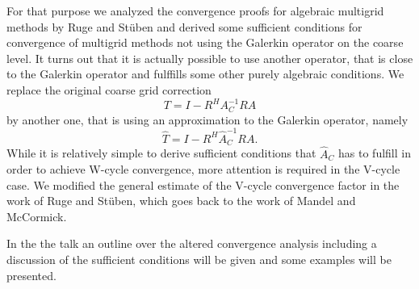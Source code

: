 \documentclass{report}
\begin{document}
For that purpose we analyzed the convergence proofs for algebraic
multigrid methods by Ruge and St\"uben and derived some sufficient
conditions for convergence of multigrid methods not using the Galerkin
operator on the coarse level. It turns out that it is actually possible
to use another operator, that is close to the Galerkin operator and
fulffills some other purely algebraic conditions. We replace the original
coarse grid correction
\begin{equation*}
T = I - R^{H} A_{C}^{-1} R A
\end{equation*}
by another one, that is using an approximation to the Galerkin operator, namely
\begin{equation*}
\hat{T} = I - R^{H} \hat{A}_{C}^{-1} R A.
\end{equation*}
While it is relatively simple to derive sufficient conditions that
$\hat{A}_{C}$ has to fulfill in order to achieve W-cycle convergence,
more attention is required in the V-cycle case. We modified the general
estimate of the V-cycle convergence factor in the work of Ruge and
St\"uben, which goes back to the work of Mandel and McCormick.

In the the talk an outline over the altered convergence analysis
including a discussion of the sufficient conditions will be given and
some examples will be presented.
\end{document}
